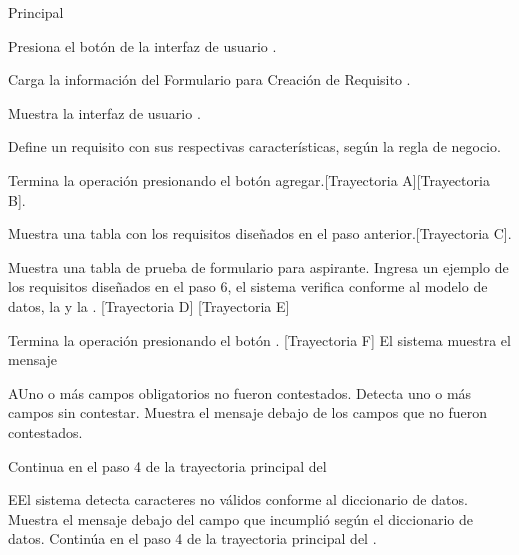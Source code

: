 \begin{UCtrayectoria}{Principal}

\UCpaso[\UCactor] Presiona el botón  de la interfaz de usuario .

\UCpaso Carga la información del Formulario para Creación de Requisito .

\UCpaso Muestra la interfaz de usuario .

\UCpaso[\UCactor] Define un requisito con sus respectivas características, según la regla de negocio.

\UCpaso[\UCactor] Termina la operación presionando el botón agregar.[Trayectoria A][Trayectoria B].

\UCpaso Muestra una tabla con los requisitos diseñados en el paso anterior.[Trayectoria C].

\UCpaso Muestra una tabla de prueba de formulario para aspirante.
\UCpaso[\UCactor] Ingresa un ejemplo de los requisitos diseñados en el paso 6, el sistema verifica conforme al modelo de datos, la  y la . [Trayectoria D] [Trayectoria E]

\UCpaso[\UCactor] Termina la operación presionando el botón . [Trayectoria F]
\UCpaso El sistema muestra el mensaje 


\end{UCtrayectoria}



\begin{UCtrayectoriaA}{A}{Uno o más campos obligatorios no fueron contestados.}
\UCpaso Detecta uno o más campos sin contestar.
\UCpaso Muestra el mensaje  debajo de los campos que no fueron contestados.

\UCpaso Continua en el paso 4 de la trayectoria principal del 
\end{UCtrayectoriaA}

\begin{UCtrayectoriaA}{E}{El sistema detecta caracteres no válidos conforme al diccionario de datos.}
	\UCpaso Muestra el mensaje  debajo del campo que incumplió según el diccionario de datos.
	\UCpaso Continúa en el paso 4 de la trayectoria principal del .
\end{UCtrayectoriaA}

